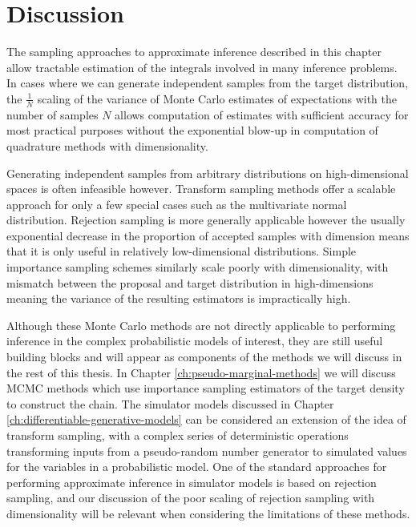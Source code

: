 \section{Discussion}

The sampling approaches to approximate inference described in this chapter allow tractable estimation of the integrals involved in many inference problems. In cases where we can generate independent samples from the target distribution, the $\frac{1}{N}$ scaling of the variance of Monte Carlo estimates of expectations with the number of samples $N$ allows computation of estimates with sufficient accuracy for most practical purposes without the exponential blow-up in computation of quadrature methods with dimensionality. %

Generating independent samples from arbitrary distributions on high-dimensional spaces is often infeasible however. Transform sampling methods offer a scalable approach for only a few special cases such as the multivariate normal distribution. Rejection sampling is more generally applicable however the usually exponential decrease in the proportion of accepted samples with dimension means that it is only useful in relatively low-dimensional distributions. Simple importance sampling schemes similarly scale poorly with dimensionality, with mismatch bet\-ween the proposal and target distribution in high-dimensions meaning the variance of the resulting estimators is impractically high.

Although these Monte Carlo methods are not directly applicable to performing inference in the complex probabilistic models of interest, they are still useful building blocks and will appear as components of the methods we will discuss in the rest of this thesis. In Chapter \ref{ch:pseudo-marginal-methods} we will discuss \ac{MCMC} methods which use importance sampling estimators of the target density to construct the chain. The simulator models discussed in Chapter \ref{ch:differentiable-generative-models} can be considered an extension of the idea of transform sampling, with a complex series of deterministic operations transforming inputs from a pseudo-random number generator to simulated values for the variables in a probabilistic model. One of the standard approaches for performing approximate inference in simulator models is based on rejection sampling, and our discussion of the poor scaling of rejection sampling with dimensionality will be relevant when considering the limitations of these methods.

